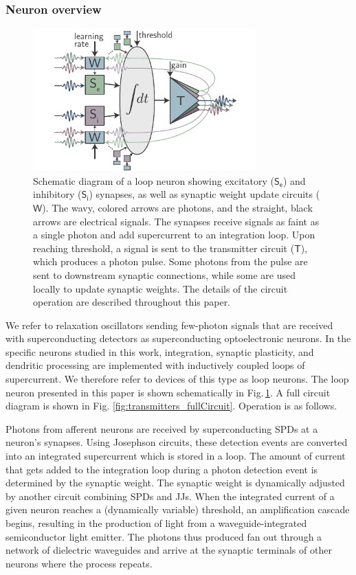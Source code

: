 \documentclass[twocolumn]{article}
\begin{document}
\subsubsection{\label{sec:neuronOverview}Neuron overview}
\begin{figure}[t!]
	\centerline{\includegraphics[width=8.6cm]{_general_schematic_small.pdf}}
	\caption{\label{fig:general_schematic}Schematic diagram of a loop neuron showing excitatory ($\mathsf{S_e}$) and inhibitory ($\mathsf{S_i}$) synapses, as well as synaptic weight update circuits ($\mathsf{W}$). The wavy, colored arrows are photons, and the straight, black arrows are electrical signals. The synapses receive signals as faint as a single photon and add supercurrent to an integration loop. Upon reaching threshold, a signal is sent to the transmitter circuit ($\mathsf{T}$), which produces a photon pulse. Some photons from the pulse are sent to downstream synaptic connections, while some are used locally to update synaptic weights. The details of the circuit operation are described throughout this paper.}
\end{figure}
We refer to relaxation oscillators sending few-photon signals that are received with superconducting detectors as superconducting optoelectronic neurons. In the specific neurons studied in this work, integration, synaptic plasticity, and dendritic processing are implemented with inductively coupled loops of supercurrent. We therefore refer to devices of this type as loop neurons. The loop neuron presented in this paper is shown schematically in Fig.\,\ref{fig:general_schematic}. A full circuit diagram is shown in Fig. \ref{fig:transmitters_fullCircuit}. Operation is as follows. 

Photons from afferent neurons are received by superconducting SPDs at a neuron's synapses. Using Josephson circuits, these detection events are converted into an integrated supercurrent which is stored in a loop. The amount of current that gets added to the integration loop during a photon detection event is determined by the synaptic weight. The synaptic weight is dynamically adjusted by another circuit combining SPDs and JJs. When the integrated current of a given neuron reaches a (dynamically variable) threshold, an amplification cascade begins, resulting in the production of light from a waveguide-integrated semiconductor light emitter. The photons thus produced fan out through a network of dielectric waveguides and arrive at the synaptic terminals of other neurons where the process repeats.
\end{document}
